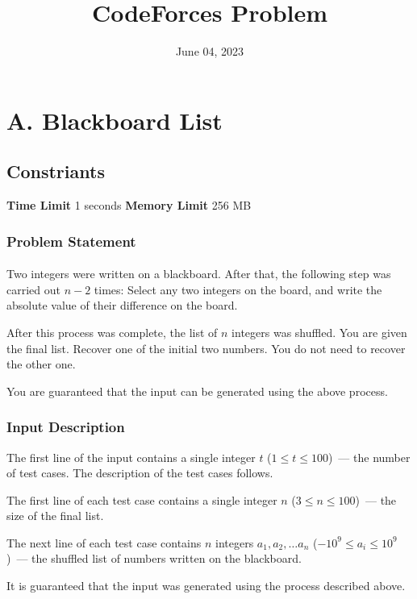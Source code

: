 \documentclass{article}
\title{CodeForces Problem}
\date{June 04, 2023}
\author{}
\begin{document}
\maketitle
\newcommand{\lt}{\ensuremath <}
\newcommand{\gt}{\ensuremath >}
\section*{A. Blackboard List}
\subsection*{Constriants}
\textbf{Time Limit}
1 seconds
\hfill
\textbf{Memory Limit}
256 MB
\subsubsection*{Problem Statement}
\paragraph{}Two integers were written on a blackboard. After that, the following step was carried out $n-2$ times:  Select any two integers on the board, and write the absolute value of their difference on the board. 

After this process was complete, the list of $n$ integers was shuffled. You are given the final list. Recover one of the initial two numbers. You do not need to recover the other one.

You are guaranteed that the input can be generated using the above process.
\paragraph{}
\subsubsection*{Input Description}The first line of the input contains a single integer $t$ ($1 \le t \le 100$) — the number of test cases. The description of the test cases follows.

The first line of each test case contains a single integer $n$ ($3 \le n \le 100$) — the size of the final list.

The next line of each test case contains $n$ integers $a_1, a_2, \ldots a_n$ ($-10^9 \le a_i \le 10^9$) — the shuffled list of numbers written on the blackboard.

It is guaranteed that the input was generated using the process described above.
\paragraph{}
\end{document}
